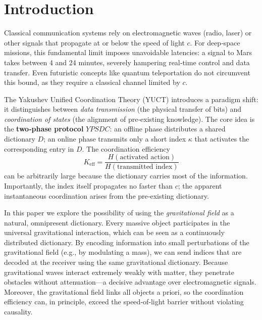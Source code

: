 \documentclass[12pt,a4paper]{article}
\newcommand{\Keff}{K_{\mathrm{eff}}}
\newcommand{\YPSDC}{YPSDC}
\begin{document}
	\tableofcontents
	\newpage
	
	\section{Introduction}
	\label{sec:intro}
	
	Classical communication systems rely on electromagnetic waves (radio, laser) or other signals that propagate at or below the speed of light \(c\). For deep‑space missions, this fundamental limit imposes unavoidable latencies: a signal to Mars takes between 4 and 24 minutes, severely hampering real‑time control and data transfer. Even futuristic concepts like quantum teleportation do not circumvent this bound, as they require a classical channel limited by \(c\).
	
	The Yakushev Unified Coordination Theory (YUCT) \cite{Yakushev2026} introduces a paradigm shift: it distinguishes between \emph{data transmission} (the physical transfer of bits) and \emph{coordination of states} (the alignment of pre‑existing knowledge). The core idea is the \textbf{two‑phase protocol} \(\YPSDC\): an offline phase distributes a shared dictionary \(D\); an online phase transmits only a short index \(\kappa\) that activates the corresponding entry in \(D\). The coordination efficiency
	\begin{equation}
		\Keff = \frac{H(\text{activated action})}{H(\text{transmitted index})}
	\end{equation}
	can be arbitrarily large because the dictionary carries most of the information. Importantly, the index itself propagates no faster than \(c\); the apparent instantaneous coordination arises from the pre‑existing dictionary.
	
	In this paper we explore the possibility of using the \emph{gravitational field} as a natural, omnipresent dictionary. Every massive object participates in the universal gravitational interaction, which can be seen as a continuously distributed dictionary. By encoding information into small perturbations of the gravitational field (e.g., by modulating a mass), we can send indices that are decoded at the receiver using the same gravitational dictionary. Because gravitational waves interact extremely weakly with matter, they penetrate obstacles without attenuation—a decisive advantage over electromagnetic signals. Moreover, the gravitational field links all objects a priori, so the coordination efficiency can, in principle, exceed the speed‑of‑light barrier without violating causality.
	
\end{document}
